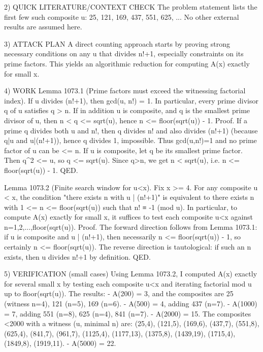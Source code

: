 2) QUICK LITERATURE/CONTEXT CHECK
The problem statement lists the first few such composite u:
  25, 121, 169, 437, 551, 625, ...
No other external results are assumed here.

3) ATTACK PLAN
A direct counting approach starts by proving strong necessary conditions on any u that divides n!+1, especially constraints on its prime factors. This yields an algorithmic reduction for computing A(x) exactly for small x.

4) WORK
Lemma 1073.1 (Prime factors must exceed the witnessing factorial index).
If u divides (n!+1), then gcd(u, n!) = 1. In particular, every prime divisor q of u satisfies q > n.
If in addition u is composite, and q is the smallest prime divisor of u, then n < q <= sqrt(u), hence n <= floor(sqrt(u)) - 1.
Proof. If a prime q divides both u and n!, then q divides n! and also divides (n!+1) (because q|u and u|(n!+1)), hence q divides 1, impossible. Thus gcd(u,n!)=1 and no prime factor of u can be <= n.
If u is composite, let q be its smallest prime factor. Then q^2 <= u, so q <= sqrt(u). Since q>n, we get n < sqrt(u), i.e. n <= floor(sqrt(u)) - 1. QED.

Lemma 1073.2 (Finite search window for u<x).
Fix x >= 4. For any composite u < x, the condition "there exists n with u | (n!+1)" is equivalent to
  there exists n with 1 <= n <= floor(sqrt(u)) such that n! ≡ -1 (mod u).
In particular, to compute A(x) exactly for small x, it suffices to test each composite u<x against n=1,2,...,floor(sqrt(u)).
Proof. The forward direction follows from Lemma 1073.1: if u is composite and u | (n!+1), then necessarily n <= floor(sqrt(u)) - 1, so certainly n <= floor(sqrt(u)).
The reverse direction is tautological: if such an n exists, then u divides n!+1 by definition. QED.

5) VERIFICATION (small cases)
Using Lemma 1073.2, I computed A(x) exactly for several small x by testing each composite u<x and iterating factorial mod u up to floor(sqrt(u)). The results:
- A(200) = 3, and the composites are 25 (witness n=4), 121 (n=5), 169 (n=6).
- A(500) = 4, adding 437 (n=7).
- A(1000) = 7, adding 551 (n=8), 625 (n=4), 841 (n=7).
- A(2000) = 15. The composites <2000 with a witness (u, minimal n) are:
  (25,4), (121,5), (169,6), (437,7), (551,8), (625,4), (841,7), (961,7), (1125,4), (1177,13),
  (1375,8), (1439,19), (1715,4), (1849,8), (1919,11).
- A(5000) = 22.

